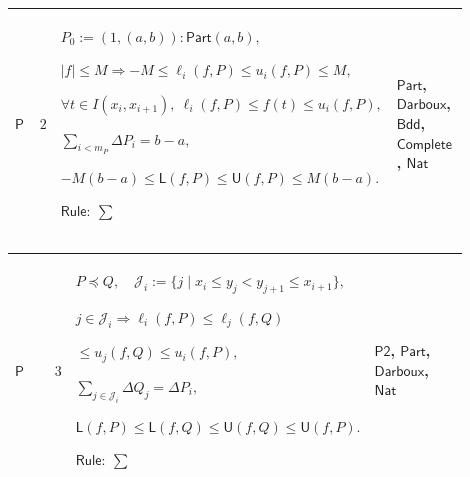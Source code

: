 \documentclass[12pt,reqno]{amsart}
\theoremstyle{blueplain}
\numberwithin{equation}{section}
\begin{document}
{\scriptsize \setlength{\parskip}{0pt}\nointerlineskip
\noindent 
\begin{tabular}{|@{}>{\centering\arraybackslash}m{0.10658\linewidth}|>{\centering\arraybackslash}m{0.03553\linewidth}|>{\centering\arraybackslash}m{0.52105\linewidth}|>{\centering\arraybackslash}m{0.23684\linewidth}|}
\hline
\hypertarget{proof:P2}{$\displaystyle \mathsf{P}$} & $\displaystyle 2$ & $%
\displaystyle P_0:=(1,(a,b)):\mathsf{Part}(a,b),$\par$\displaystyle |f|\le
M\Rightarrow -M\le\ell_i(f,P)\le u_i(f,P)\le M,$\par$\displaystyle \forall
t\in I(x_i,x_{i+1}),\ \ell_i(f,P)\le f(t)\le u_i(f,P),$\par$\displaystyle %
\sum_{i<m_P}\Delta P_i=b-a,$\par$\displaystyle -M(b-a)\le\mathsf{L}(f,P)\le%
\mathsf{U}(f,P)\le M(b-a).$\par$\displaystyle \mathsf{Rule}:\ \sum$ & 
\hyperlink{def:Part}{$\displaystyle \mathsf{Part}$}, \hyperlink{def:Darboux}{%
$\displaystyle \mathsf{Darboux}$}, \hyperlink{def:Bdd}{$\displaystyle 
\mathsf{Bdd}$}, \hyperlink{ax:Complete}{$\displaystyle \mathsf{Complete}$}, 
\hyperlink{ax:Nat}{$\displaystyle \mathsf{Nat}$} \\ \hline
\end{tabular}%
}

{\scriptsize \setlength{\parskip}{0pt}\nointerlineskip
\noindent 
\begin{tabular}{|@{}>{\centering\arraybackslash}m{0.10658\linewidth}|>{\centering\arraybackslash}m{0.03553\linewidth}|>{\centering\arraybackslash}m{0.52105\linewidth}|>{\centering\arraybackslash}m{0.23684\linewidth}|}
\hline
\hypertarget{proof:P3}{$\displaystyle \mathsf{P}$} & $\displaystyle 3$ & $%
\displaystyle P\preceq Q,\quad\mathcal{J}_i:=\{j\mid x_i\le y_j<y_{j+1}\le
x_{i+1}\},$\par$\displaystyle j\in\mathcal{J}_i\Rightarrow\ell_i(f,P)\le%
\ell_j(f,Q)$\par$\displaystyle {}\le u_j(f,Q)\le u_i(f,P),$\par$%
\displaystyle \sum_{j\in\mathcal{J}_i}\Delta Q_j=\Delta P_i,$\par$%
\displaystyle \mathsf{L}(f,P)\le\mathsf{L}(f,Q)\le\mathsf{U}(f,Q)\le\mathsf{U%
}(f,P).$\par$\displaystyle \mathsf{Rule}:\ \sum$ & \hyperlink{proof:P2}{$%
\displaystyle \mathsf{P2}$}, \hyperlink{def:Part}{$\displaystyle \mathsf{Part%
}$}, \hyperlink{def:Darboux}{$\displaystyle \mathsf{Darboux}$}, \hyperlink{ax:Nat}%
{$\displaystyle \mathsf{Nat}$} \\ \hline
\end{tabular}%
}
\end{document}
